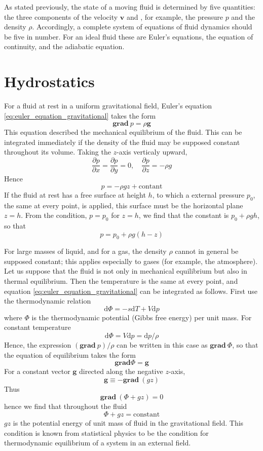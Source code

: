 \documentclass[conference]{IEEEtran}
\theoremstyle{definition}
\theoremstyle{remark}
\begin{document}
    As stated previously, the state of a moving fluid is determined by five quantities: the three components of the velocity $\mathbf{v}$ and , for example, the pressure $p$ and the density $\rho$. Accordingly, a complete system of equations of fluid dynamics should be five in number. For an ideal fluid these are Euler's equations, the equation of continuity, and the adiabatic equation.

    \section{Hydrostatics}
    For a fluid at rest in a uniform gravitational field, Euler's equation \ref{eq:euler_equation_gravitational} takes the form
    \begin{equation}
        \textbf{grad} \ p = \rho \mathbf{g}
        \label{eq:gravitational_field}
    \end{equation}
    This equation described the mechanical equilibrium of the fluid. This can be integrated immediately if the density of the fluid may be supposed constant throughout its volume. Taking the $z$-axis verticaly upward,
    \[
        \dfrac{\partial p}{\partial x} = \dfrac{\partial p}{\partial y} = 0, \quad \dfrac{\partial p}{\partial z} = -\rho g
    \]
    Hence
    \[
        p = - \rho g z + \text{contant}
    \]
    If the fluid at rest has a free surface at height $h$, to which a external pressure $p_0$, the same at every point, is applied, this surface must be the horizontal plane $z = h$. From the condition, $p = p_0$ for $z = h$, we find that the constant is $p_0 + \rho g h$, so that
    \begin{equation}
        p = p_0 + \rho g (h - z)
    \end{equation}

    For large masses of liquid, and for a gas, the density $\rho$ cannot in general be supposed constant; this applies especially to gases (for example, the atmosphere). Let us suppose that the fluid is not only in mechanical equilibrium but also in thermal equilibrium. Then the temperature is the same at every point, and equation \ref{eq:euler_equation_gravitational} can be integrated as follows. First use the thermodynamic relation
    \[
        \mathrm{d} \Phi = -s \mathrm{d} T + V \mathrm{d} p
    \]
    where $\Phi$ is the thermodynamic potential (Gibbs free energy) per unit mass. For constant temperature
    \[
        \mathrm{d} \Phi = V \mathrm{d} p = \mathrm{d} p / \rho
    \]
    Hence, the expression $(\textbf{grad} \ p) / \rho$ can be written in this case as $\textbf{grad} \ \Phi$, so that the equation of equilibrium takes the form
    \[
        \textbf{grad} \Phi = \mathbf{g}
    \]
    For a constant vector $\mathbf{g}$ directed along the negative $z$-axis,
    \[
        \mathbf{g} \equiv -\mathbf{grad} \ (gz)
    \]
    Thus
    \[
        \textbf{grad} \ (\Phi + gz) = 0
    \]
    hence we find that throughout the fluid
    \[
        \Phi + gz = \text{constant}
    \]
    $gz$ is the potential energy of unit mass of fluid in the gravitational field. This condition is known from statistical physics to be the condition for thermodynamic equilibrium of a system in an external field.
\end{document}
